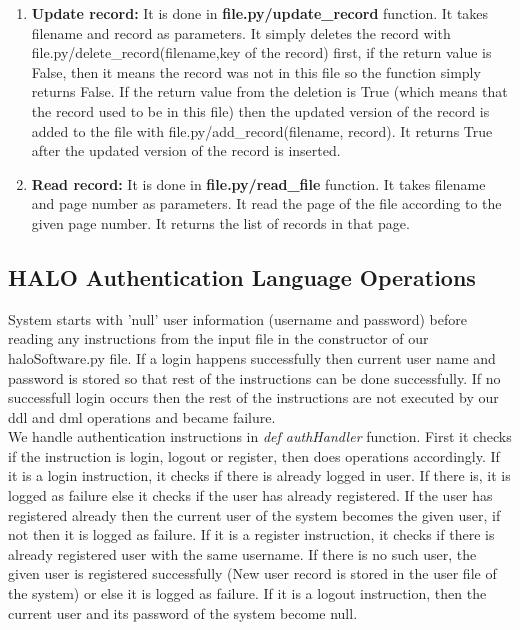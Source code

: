 \documentclass{article}
\begin{document}
\begin{enumerate}
    \item \textbf{Update record:} It is done in \textbf{file.py\slash update\_record} function. It takes filename and record as parameters. It simply deletes the record with file.py\slash delete\_record(filename,key of the record) first, if the return value is False, then it means the record was not in this file so the function simply returns False. If the return value from the deletion is True (which means that the record used to be in this file) then the updated version of the record is added to the file with file.py\slash add\_record(filename, record). It returns True after the updated version of the record is inserted. 
    \item \textbf{Read record:} It is done in \textbf{file.py\slash read\_file} function. It takes filename and page number as parameters. It read the page of the file according to the given page number. It returns the list of records in that page.
\end{enumerate}

\subsection{HALO Authentication Language Operations}
System starts with 'null' user information (username and password) before reading any instructions from the input file in the constructor of our haloSoftware.py file. If a login happens successfully then current user name and password is stored so that rest of the instructions can be done successfully. If no successfull login occurs then the rest of the instructions are not executed by our ddl and dml operations and became failure.\\
We handle authentication instructions in \emph{def authHandler} function. First it checks if the instruction is login, logout or register, then does operations accordingly. If it is a login instruction, it checks if there is already logged in user. If there is, it is logged as failure else it checks if the user has already registered. If the user has registered already then the current user of the system becomes the given user, if not then it is logged as failure. If it is a register instruction, it checks if there is already registered user with the same username. If there is no such user, the given user is registered successfully (New user record is stored in the user file of the system) or else it is logged as failure. If it is a logout instruction, then the current user and its password of the system become null.
\end{document}
